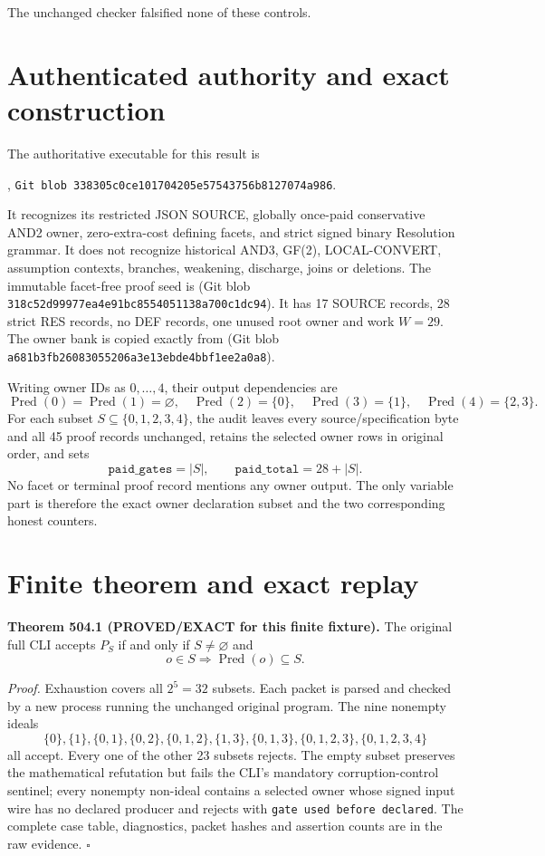 \documentclass[11pt]{article}
\begin{document}
The unchanged checker falsified none of these controls.

\section*{Authenticated authority and exact construction}
The authoritative executable for this result is
\begin{center}
,\qquad
\texttt{Git blob 338305c0ce101704205e57543756b8127074a986}.
\end{center}
It recognizes its restricted JSON SOURCE, globally once-paid conservative AND2 owner, zero-extra-cost defining facets, and strict signed binary Resolution grammar.  It does not recognize historical AND3, GF(2), LOCAL-CONVERT, assumption contexts, branches, weakening, discharge, joins or deletions.  The immutable facet-free proof seed is
(Git blob \texttt{318c52d99977ea4e91bc8554051138a700c1dc94}).  It has 17 SOURCE records, 28 strict RES records, no DEF records, one unused root owner and work \(W=29\).  The owner bank is copied exactly from
(Git blob \texttt{a681b3fb26083055206a3e13ebde4bbf1ee2a0a8}).

Writing owner IDs as \(0,\ldots,4\), their output dependencies are
\[
 \operatorname{Pred}(0)=\operatorname{Pred}(1)=\varnothing,
 \quad\operatorname{Pred}(2)=\{0\},
 \quad\operatorname{Pred}(3)=\{1\},
 \quad\operatorname{Pred}(4)=\{2,3\}.
\]
For each subset \(S\subseteq\{0,1,2,3,4\}\), the audit leaves every source/specification byte and all 45 proof records unchanged, retains the selected owner rows in original order, and sets
\[
 \texttt{paid\_gates}=|S|,
 \qquad \texttt{paid\_total}=28+|S|.
\]
No facet or terminal proof record mentions any owner output.  The only variable part is therefore the exact owner declaration subset and the two corresponding honest counters.

\section*{Finite theorem and exact replay}
\textbf{Theorem 504.1 (PROVED/EXACT for this finite fixture).}
The original full CLI accepts \(P_S\) if and only if \(S\ne\varnothing\) and
\[
 o\in S\Longrightarrow\operatorname{Pred}(o)\subseteq S.
\]

\textit{Proof.}  Exhaustion covers all \(2^5=32\) subsets.  Each packet is parsed and checked by a new process running the unchanged original program.  The nine nonempty ideals
\[
 \{0\},\{1\},\{0,1\},\{0,2\},\{0,1,2\},\{1,3\},
 \{0,1,3\},\{0,1,2,3\},\{0,1,2,3,4\}
\]
all accept.  Every one of the other 23 subsets rejects.  The empty subset preserves the mathematical refutation but fails the CLI's mandatory corruption-control sentinel; every nonempty non-ideal contains a selected owner whose signed input wire has no declared producer and rejects with \texttt{gate used before declared}.  The complete case table, diagnostics, packet hashes and assertion counts are in the raw evidence. \(\square\)
\end{document}
